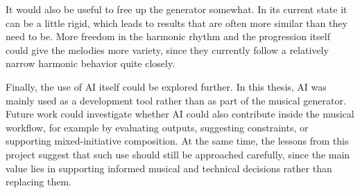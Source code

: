   It would also be useful to free up the generator somewhat. In its current state it can be a little rigid, which leads to results that are often more similar than they need to be. More freedom in the harmonic rhythm and the progression itself could give the melodies more variety, since they currently follow a relatively narrow harmonic behavior quite closely.

  Finally, the use of \ac{AI} itself could be explored further. In this thesis, \ac{AI} was mainly used as a development tool rather than as part of the musical generator. Future work could investigate whether \ac{AI} could also contribute inside the musical workflow, for example by evaluating outputs, suggesting constraints, or supporting mixed-initiative composition. At the same time, the lessons from this project suggest that such use should still be approached carefully, since the main value lies in supporting informed musical and technical decisions rather than replacing them.
